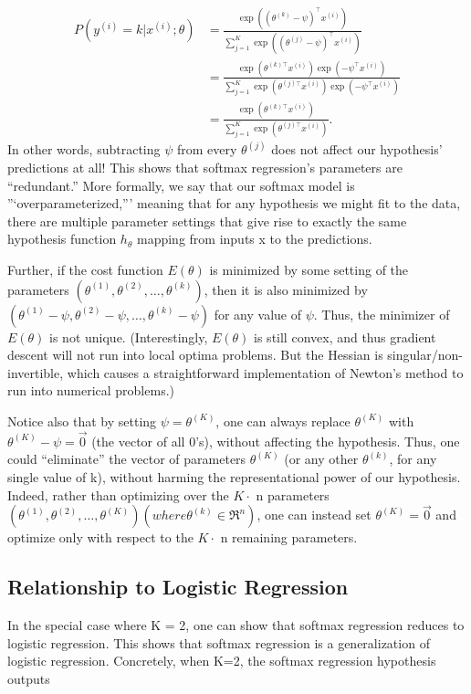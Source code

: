 \begin{align} 
P(y^{(i)} = k | x^{(i)} ; \theta) &= \frac{\exp((\theta^{(k)}-\psi)^\top x^{(i)})}{\sum_{j=1}^K \exp( (\theta^{(j)}-\psi)^\top x^{(i)})} \\ &= \frac{\exp(\theta^{(k)\top} x^{(i)}) \exp(-\psi^\top x^{(i)})}{\sum_{j=1}^K \exp(\theta^{(j)\top} x^{(i)}) \exp(-\psi^\top x^{(i)})} \\ &= \frac{\exp(\theta^{(k)\top} x^{(i)})}{\sum_{j=1}^K \exp(\theta^{(j)\top} x^{(i)})}. 
\end{align}
In other words, subtracting $\psi$ from every $\theta^{(j)}$ does not affect our hypothesis’ predictions at all! This shows that softmax regression’s parameters are “redundant.” More formally, we say that our softmax model is ”‘overparameterized,”’ meaning that for any hypothesis we might fit to the data, there are multiple parameter settings that give rise to exactly the same hypothesis function $h_\theta$ mapping from inputs x to the predictions.

Further, if the cost function $E(\theta)$ is minimized by some setting of the parameters $(\theta^{(1)}, \theta^{(2)},\ldots, \theta^{(k)})$, then it is also minimized by $(\theta^{(1)} - \psi, \theta^{(2)} - \psi,\ldots, \theta^{(k)} - \psi)$ for any value of $\psi$. Thus, the minimizer of $E(\theta)$ is not unique. (Interestingly, $E(\theta)$ is still convex, and thus gradient descent will not run into local optima problems. But the Hessian is singular/non-invertible, which causes a straightforward implementation of Newton’s method to run into numerical problems.)

Notice also that by setting $\psi = \theta^{(K)}$, one can always replace $\theta^{(K)}$ with $\theta^{(K)} - \psi = \vec{0}$ (the vector of all 0’s), without affecting the hypothesis. Thus, one could “eliminate” the vector of parameters $\theta^{(K)}$ (or any other $\theta^{(k)}$, for any single value of k), without harming the representational power of our hypothesis. Indeed, rather than optimizing over the $K\cdot$ n parameters $(\theta^{(1)}, \theta^{(2)},\ldots, \theta^{(K)}) (where \theta^{(k)} \in \Re^{n})$, one can instead set $\theta^{(K)} = \vec{0}$ and optimize only with respect to the $K \cdot$ n remaining parameters.

\subsection{Relationship to Logistic Regression}

In the special case where K = 2, one can show that softmax regression reduces to logistic regression. This shows that softmax regression is a generalization of logistic regression. Concretely, when K=2, the softmax regression hypothesis outputs

